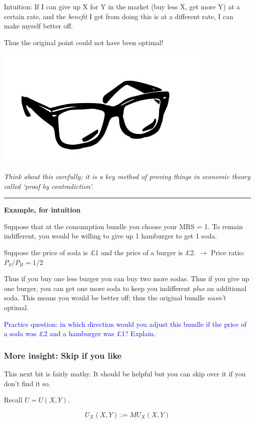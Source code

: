 \documentclass[]{article}
\begin{document}
\bigskip

Intuition: If I can give up X for Y in the market (buy less X, get more
Y) at a certain rate, and the \emph{benefit} I get from doing this is at
a different rate, I can make myself better off.

Thus the original point could not have been optimal!

\includegraphics[height=.7in]{picsfigs/glasses.png}

\emph{Think about this carefully; it is a key method of proving things
in economic theory called `proof by contradiction'.}

\begin{center}\rule{0.5\linewidth}{\linethickness}\end{center}

\textbf{Example, for intuition}

Suppose that at the consumption bundle you choose your MRS = 1. To
remain indifferent, you would be willing to give up 1 hamburger to get 1
soda.

Suppose the price of soda is £1 and the price of a burger is £2.
\(\rightarrow\) Price ratio: \(P_S/P_B = 1/2\)

Thus if you buy one less burger you can buy two more sodas. Thus if you
give up one burger, you can get one more soda to keep you indifferent
\emph{plus} an additional soda. This means you would be better off; thus
the original bundle \emph{wasn't} optimal.

\textcolor{blue}{Practice question: in which direction would you adjust this bundle if the price of a soda was £2 and a hamburger was £1? Explain.}

\hypertarget{more-insight-skip-if-you-like}{%
\subsubsection{More insight: Skip if you
like}\label{more-insight-skip-if-you-like}}

This next bit is fairly mathy. It should be helpful but you can skip
over it if you don't find it so.

Recall \(U=U(X,Y)\).

\[U_X(X,Y) := MU_X(X,Y)\]

\medskip
\end{document}
